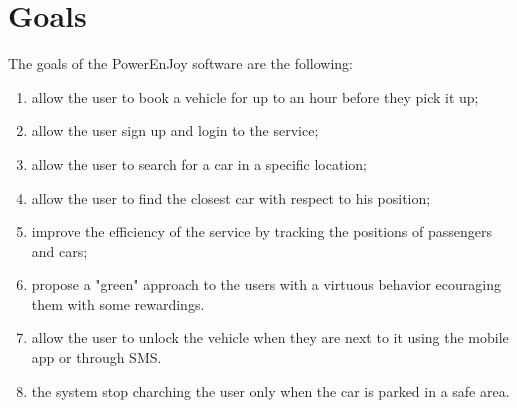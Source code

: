 \section{Goals}
The goals of the PowerEnJoy software are the following:
\begin{enumerate}
	\item allow the user to book a vehicle for up to an hour before they pick it up; \label{g-simplify}
	\item allow the user sign up and login to the service;  \label{g-login}	
	\item allow the user to search for a car in a specific location;  \label{g-taxicall}
	\item allow the user to find the closest car with respect to his position;  \label{g-reserve}
	\item improve the efficiency of the service by tracking the positions of passengers and cars;  \label{g-position}
	\item propose a "green" approach to the users with a virtuous behavior ecouraging them with some rewardings. \label{g-share}
	\item allow the user to unlock the vehicle when they are next to it using the mobile app or through SMS.
	\item the system stop charching the user only when the car is parked in a safe area.
\end{enumerate}